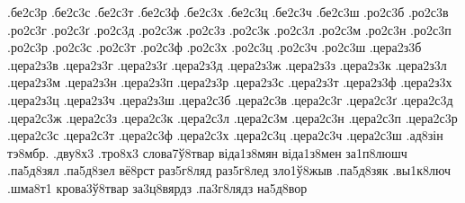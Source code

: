 {.бе2с3р
.бе2с3с
.бе2с3т
.бе2с3ф
.бе2с3х
.бе2с3ц
.бе2с3ч
.бе2с3ш
.ро2с3б
.ро2с3в
.ро2с3г
.ро2с3ґ
.ро2с3д
.ро2с3ж
.ро2с3з
.ро2с3к
.ро2с3л
.ро2с3м
.ро2с3н
.ро2с3п
.ро2с3р
.ро2с3с
.ро2с3т
.ро2с3ф
.ро2с3х
.ро2с3ц
.ро2с3ч
.ро2с3ш
.цера2з3б
.цера2з3в
.цера2з3г
.цера2з3ґ
.цера2з3д
.цера2з3ж
.цера2з3з
.цера2з3к
.цера2з3л
.цера2з3м
.цера2з3н
.цера2з3п
.цера2з3р
.цера2з3с
.цера2з3т
.цера2з3ф
.цера2з3х
.цера2з3ц
.цера2з3ч
.цера2з3ш
.цера2с3б
.цера2с3в
.цера2с3г
.цера2с3ґ
.цера2с3д
.цера2с3ж
.цера2с3з
.цера2с3к
.цера2с3л
.цера2с3м
.цера2с3н
.цера2с3п
.цера2с3р
.цера2с3с
.цера2с3т
.цера2с3ф
.цера2с3х
.цера2с3ц
.цера2с3ч
.цера2с3ш
.ад8зін
тэ8мбр.
.дву8х3
.тро8х3
слова7ў8твар
віда1з8мян
віда1з8мен
за1п8люшч
.па5д8зял
.па5д8зел
вё8рст
раз5г8ляд
раз5г8лед
зло1ў8жыв
.па5д8зяк
.вы1к8люч
.шма8т1
крова3ў8твар
за3ц8вярдз
.па3г8лядз
на5д8вор
}

